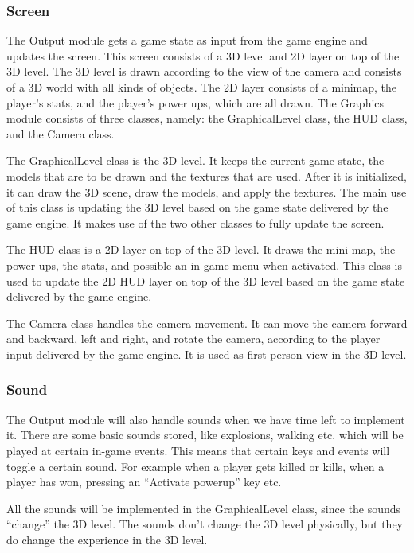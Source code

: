     \subsubsection{Screen} %
    \label{ssub:screen}
        The Output module gets a game state as input from the game engine and updates the screen. This screen consists of a 3D level and 2D layer on top of the 3D level. The 3D level is drawn according to the view of the camera and consists of a 3D world with all kinds of objects. The 2D layer consists of a minimap, the player's stats, and the player's power ups, which are all drawn. The Graphics module consists of three classes, namely: the GraphicalLevel class, the HUD class, and the Camera class.

           The GraphicalLevel class is the 3D level. It keeps the current game state, the models that are to be drawn and the textures that are used. After it is initialized, it can draw the 3D scene, draw the models, and apply the textures. The main use of this class is updating the 3D level based on the game state delivered by the game engine. It makes use of the two other classes to fully update the screen.

           The HUD class is a 2D layer on top of the 3D level. It draws the mini map, the power ups, the stats, and possible an in-game menu when activated. This class is used to update the 2D HUD layer on top of the 3D level based on the game state delivered by the game engine.

           The Camera class handles the camera movement. It can move the camera forward and backward, left and right, and rotate the camera, according to the player input delivered by the game engine. It is used as first-person view in the 3D level.

    \subsubsection{Sound} %
    \label{ssub:sound}
        The Output module will also handle sounds when we have time left to implement it. There are some basic sounds stored, like explosions, walking etc. which will be played at certain in-game events. This means that certain keys and events will toggle a certain sound. For example when a player gets killed or kills, when a player has won, pressing an ``Activate powerup'' key etc.

           All the sounds will be implemented in the GraphicalLevel class, since the sounds ``change'' the 3D level. The sounds don't change the 3D level physically, but they do change the experience in the 3D level.
       
